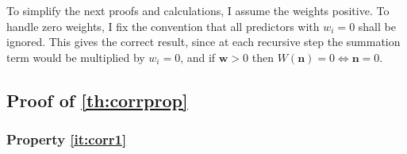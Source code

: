 \documentclass[a4paper]{article}
\theoremstyle{definition}
\begin{document}
    To simplify the next proofs and calculations, I assume the weights positive. To handle zero weights, I fix the convention that all predictors with $w_i = 0$ shall be ignored. This gives the correct result, since at each recursive step the summation term would be multiplied by $w_i = 0$, and if $\mathbf w > 0$ then $W(\mathbf n) = 0 \iff \mathbf n = 0$.
    
    \subsection{Proof of \autoref{th:corrprop}}
    \label{sec:corrprop}
    
    \subsubsection{Property \ref{it:corr1}}
    
\end{document}
